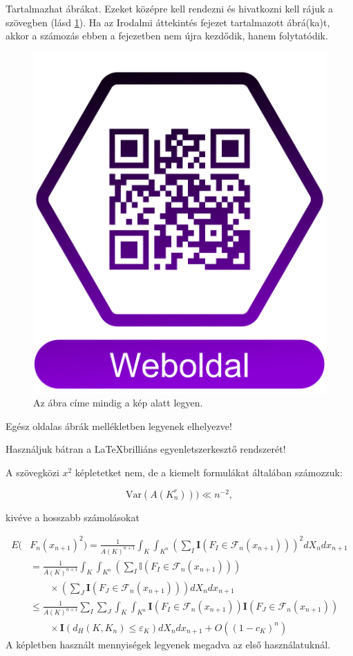 \documentclass[a4paper,12pt]{report}
\theoremstyle{definition}
\theoremstyle{remark}
\begin{document}
Tartalmazhat ábrákat. Ezeket középre kell rendezni és hivatkozni kell rájuk a szövegben (lásd \ref{fig:korokuj}). Ha az Irodalmi áttekintés fejezet tartalmazott ábrá(ka)t, akkor a számozás ebben a fejezetben nem újra kezdődik, hanem folytatódik.

\begin{figure}
\centering
\includegraphics[height=7 cm]{b4918.png}
\caption{ \label{fig:korokuj} Az ábra címe mindig a kép alatt legyen.
}
\end{figure}

Egész oldalas ábrák mellékletben legyenek elhelyezve!

Használjuk bátran a \LaTeX  brilliáns egyenletszerkesztő rendszerét!

A szövegközi $x^2$ képletetket nem, de a kiemelt formulákat általában számozzuk:

 \begin{equation}\label{circle-area}
\mathrm{Var} (A(K_n^r)))\ll n^{-2},
\end{equation}

kivéve a hosszabb számolásokat

\begin{align}
E (& F_n(x_{n+1})^2) = \frac 1{A(K)^{n+1}}\int_K\int_{K^n} \left (\sum_I \mathbf I (F_I\in\mathcal F_{n}(x_{n+1}))\right )^2 d X_n d x_{n+1}\nonumber\\
& = \frac 1{A(K)^{n+1}} \int_K\int_{K^n} \left (\sum_I \mathbb I (F_I\in\mathcal F_{n}(x_{n+1}))\right ) \nonumber \\
& \quad \quad \times \left (\sum_J \mathbf I (F_J\in\mathcal F_{n}(x_{n+1}))\right ) d X_n d x_{n+1}\nonumber\\
&\leq \frac 1{A(K)^{n+1}}\sum_I\sum_J \int_K\int_{K^n} \mathbf I (F_I\in\mathcal F_{n}(x_{n+1}))
\mathbf I (F_J\in\mathcal F_{n}(x_{n+1}))\nonumber\\
&\quad\quad\times\mathbf I(d_H(K,K_n)\leq\varepsilon_K) d X_n d x_{n+1}
+O((1-c_K)^n)\label{ineq1}
\end{align}
A képletben használt mennyiségek legyenek megadva az első használatuknál.
\end{document}
